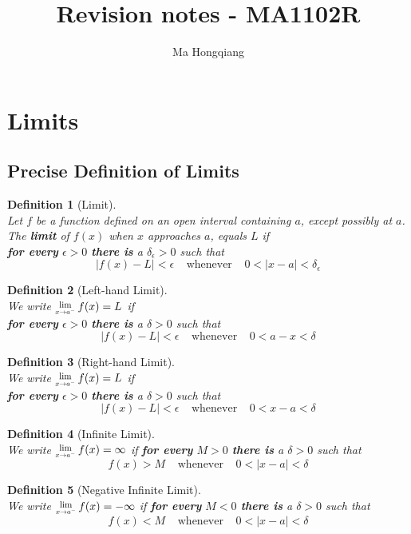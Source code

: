 \documentclass[12pt]{article}
\newcommand{\Lim}[1]{\raisebox{0.5ex}{\scalebox{0.8}{$\displaystyle \lim_{#1}\;$}}}
\newtheorem{definition}{Definition}[section]
\theoremstyle{definition}
\begin{document}
\title{Revision notes - MA1102R}
\author{Ma Hongqiang}
\maketitle
\tableofcontents

\clearpage

\section{Limits}
\subsection{Precise Definition of Limits}
\begin{definition}[Limit]
\hfill\\
\normalfont Let $f$ be a function defined on an open interval containing $a$, except possibly at $a$.\\
The \textbf{limit} of $f(x)$ when $x$ approaches $a$, equals $L$ if\\
\textbf{for every} $\epsilon>0$ \textbf{there is} a $\delta_{\epsilon}>0$ such that
\[
|f(x)-L|<\epsilon\;\;\;\;\text{whenever}\;\;\;\;0<|x-a|<\delta_{\epsilon}
\]
\end{definition}
\begin{definition}[Left-hand Limit]
\hfill\\
\normalfont We write $\Lim{x\to a^{-}}f(x)=L$ if\\
\textbf{for every} $\epsilon>0$ \textbf{there is} a $\delta>0$ such that
\[
|f(x)-L|<\epsilon\;\;\;\;\text{whenever}\;\;\;\;0<a-x<\delta
\]
\end{definition}
\begin{definition}[Right-hand Limit]
\hfill\\
\normalfont We write $\Lim{x\to a^{-}}f(x)=L$ if\\
\textbf{for every} $\epsilon>0$ \textbf{there is} a $\delta>0$ such that
\[
|f(x)-L|<\epsilon\;\;\;\;\text{whenever}\;\;\;\;0<x-a<\delta
\]
\end{definition}
\begin{definition}[Infinite Limit]
\hfill\\
\normalfont We write $\Lim{x\to a^{-}}f(x)=\infty$ if
\textbf{for every} $M>0$ \textbf{there is} a $\delta>0$ such that
\[
f(x)>M\;\;\;\;\text{whenever}\;\;\;\;0<|x-a|<\delta
\]
\end{definition}
\begin{definition}[Negative Infinite Limit]
\hfill\\
\normalfont We write $\Lim{x\to a^{-}}f(x)=-\infty$ if
\textbf{for every} $M<0$ \textbf{there is} a $\delta>0$ such that
\[
f(x)<M\;\;\;\;\text{whenever}\;\;\;\;0<|x-a|<\delta
\]
\end{definition}
\end{document}
